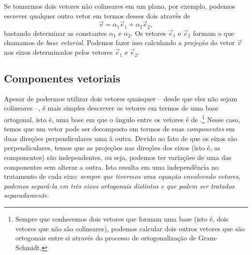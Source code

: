 Se tomarmos dois vetores não colineares em um plano, por exemplo, podemos escrever qualquer outro vetor em termos desses dois através de
\begin{equation}
  \vec{v} = \alpha_1 \vec{e}_1 + \alpha_2 \vec{e}_2,
\end{equation}
%
bastando determinar as constantes $\alpha_1$ e $\alpha_2$. Os vetores $\vec{e}_1$ e $\vec{e}_2$ formam o que chamamos de \emph{base vetorial}. Podemos fazer isso calculando a \emph{projeção} do vetor $\vec{v}$ nos eixos determinados pelos vetores $\vec{e}_1$ e $\vec{e}_2$. 

\subsection{Componentes vetoriais}\label{Sec:ComponentesVetoriais}

\noindent{}Apesar de podermos utilizar dois vetores quaisquer -- desde que eles não sejam colineares --, é mais simples descrever os vetores em termos de uma base ortogonal, isto é, uma base em que o ângulo entre os vetores é de .\footnote{Sempre que conhecemos dois vetores que formam uma base (isto é, dois vetores que não são colineares), podemos calcular dois outros vetores que são ortogonais entre si através do processo de ortogonalização de Gram-Schmidt.} Nesse caso, temos que um vetor pode ser decomposto em termos de suas \emph{componentes} em duas direções perpendiculares uma à outra. Devido ao fato de que os eixos são perpendiculares, temos que as projeções nas direções dos eixos (isto é, as componentes) são independentes, ou seja, podemos ter variações de uma das componentes sem alterar a outra. Isto resulta em uma independência no tratamento de cada eixo: \emph{sempre que tivermos uma equação envolvendo vetores, podemos separá-la em três eixos ortogonais distintos e que podem ser tratados separadamente}. 

